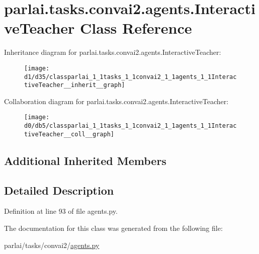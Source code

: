 \hypertarget{classparlai_1_1tasks_1_1convai2_1_1agents_1_1InteractiveTeacher}{}\section{parlai.\+tasks.\+convai2.\+agents.\+Interactive\+Teacher Class Reference}
\label{classparlai_1_1tasks_1_1convai2_1_1agents_1_1InteractiveTeacher}


Inheritance diagram for parlai.\+tasks.\+convai2.\+agents.\+Interactive\+Teacher\+:
\nopagebreak
\begin{figure}[H]
\begin{center}
\leavevmode
\texttt{[image: d1/d35/classparlai\_1\_1tasks\_1\_1convai2\_1\_1agents\_1\_1InteractiveTeacher\_\_inherit\_\_graph]}
\end{center}
\end{figure}


Collaboration diagram for parlai.\+tasks.\+convai2.\+agents.\+Interactive\+Teacher\+:
\nopagebreak
\begin{figure}[H]
\begin{center}
\leavevmode
\texttt{[image: d0/db5/classparlai\_1\_1tasks\_1\_1convai2\_1\_1agents\_1\_1InteractiveTeacher\_\_coll\_\_graph]}
\end{center}
\end{figure}
\subsection*{Additional Inherited Members}


\subsection{Detailed Description}


Definition at line 93 of file agents.\+py.



The documentation for this class was generated from the following file\+:\begin{DoxyCompactItemize}
\item 
parlai/tasks/convai2/\hyperlink{parlai_2tasks_2convai2_2agents_8py}{agents.\+py}\end{DoxyCompactItemize}
